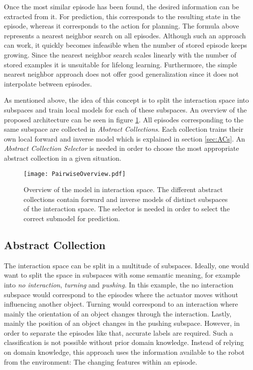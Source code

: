 Once the most similar episode has been found, the desired information can be extracted from it. For prediction, this corresponds to the resulting state in the episode, whereas it corresponds to the action for planning. The formula above represents a nearest neighbor search on all episodes. Although such an approach can work, it quickly becomes infeasible when the number of stored episode keeps growing. Since the nearest neighbor search scales linearly with the number of stored examples it is unsuitable for lifelong learning. Furthermore, the simple nearest neighbor approach does not offer good generalization since it does not interpolate between episodes.

As mentioned above, the idea of this concept is to split the interaction space into subspaces and train local models for each of these subspaces. An overview of the proposed architecture can be seen in figure \ref{fig:PairOverview}.
All episodes corresponding to the same subspace are collected in \textit{Abstract Collections}. Each collection trains their own local forward and inverse model which is explained in section \ref{sec:ACs}.
An \textit{Abstract Collection Selector} is needed in order to choose the most appropriate abstract collection in a given situation. 


\begin{figure}
	\centering
	\texttt{[image: PairwiseOverview.pdf]}
	\caption{Overview of the model in interaction space. The different abstract collections contain forward and inverse models of distinct subspaces of the interaction space. The selector is needed in order to select the correct submodel for prediction.}%
	\label{fig:PairOverview}
\end{figure}

\subsection{Abstract Collection \label{sec:ACs}}

The interaction space can be split in a multitude of subspaces. Ideally, one would want to split the space in subspaces with some semantic meaning, for example into \textit{no interaction}, \textit{turning} and \textit{pushing}. In this example, the no interaction subspace would correspond to the episodes where the actuator moves without influencing another object. Turning would correspond to an interaction where mainly the orientation of an object changes through the interaction. Lastly, mainly the position of an object changes in the pushing subspace. However, in order to separate the episodes like that, accurate labels are required. Such a classification is not possible without prior domain knowledge. Instead of relying on domain knowledge, this approach uses the information available to the robot from the environment: The changing features within an episode.

